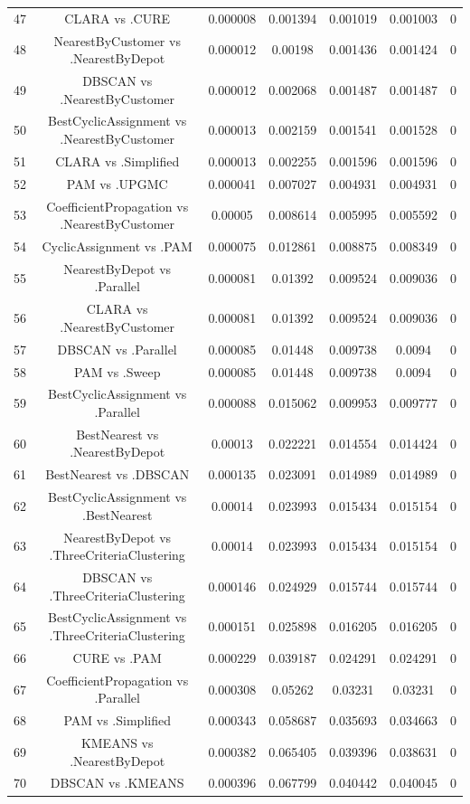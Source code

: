 \documentclass[a4paper,10pt]{article}
\begin{document}
\begin{landscape}
\begin{table}[!htp]
\begin{tabular}{ccccccc}
47&CLARA vs .CURE&0.000008&0.001394&0.001019&0.001003&0\\
48&NearestByCustomer vs .NearestByDepot&0.000012&0.00198&0.001436&0.001424&0\\
49&DBSCAN vs .NearestByCustomer&0.000012&0.002068&0.001487&0.001487&0\\
50&BestCyclicAssignment vs .NearestByCustomer&0.000013&0.002159&0.001541&0.001528&0\\
51&CLARA vs .Simplified&0.000013&0.002255&0.001596&0.001596&0\\
52&PAM vs .UPGMC&0.000041&0.007027&0.004931&0.004931&0\\
53&CoefficientPropagation vs .NearestByCustomer&0.00005&0.008614&0.005995&0.005592&0\\
54&CyclicAssignment vs .PAM&0.000075&0.012861&0.008875&0.008349&0\\
55&NearestByDepot vs .Parallel&0.000081&0.01392&0.009524&0.009036&0\\
56&CLARA vs .NearestByCustomer&0.000081&0.01392&0.009524&0.009036&0\\
57&DBSCAN vs .Parallel&0.000085&0.01448&0.009738&0.0094&0\\
58&PAM vs .Sweep&0.000085&0.01448&0.009738&0.0094&0\\
59&BestCyclicAssignment vs .Parallel&0.000088&0.015062&0.009953&0.009777&0\\
60&BestNearest vs .NearestByDepot&0.00013&0.022221&0.014554&0.014424&0\\
61&BestNearest vs .DBSCAN&0.000135&0.023091&0.014989&0.014989&0\\
62&BestCyclicAssignment vs .BestNearest&0.00014&0.023993&0.015434&0.015154&0\\
63&NearestByDepot vs .ThreeCriteriaClustering&0.00014&0.023993&0.015434&0.015154&0\\
64&DBSCAN vs .ThreeCriteriaClustering&0.000146&0.024929&0.015744&0.015744&0\\
65&BestCyclicAssignment vs .ThreeCriteriaClustering&0.000151&0.025898&0.016205&0.016205&0\\
66&CURE vs .PAM&0.000229&0.039187&0.024291&0.024291&0\\
67&CoefficientPropagation vs .Parallel&0.000308&0.05262&0.03231&0.03231&0\\
68&PAM vs .Simplified&0.000343&0.058687&0.035693&0.034663&0\\
69&KMEANS vs .NearestByDepot&0.000382&0.065405&0.039396&0.038631&0\\
70&DBSCAN vs .KMEANS&0.000396&0.067799&0.040442&0.040045&0\\

\end{tabular}
\end{table}
\end{landscape}
\end{document}
